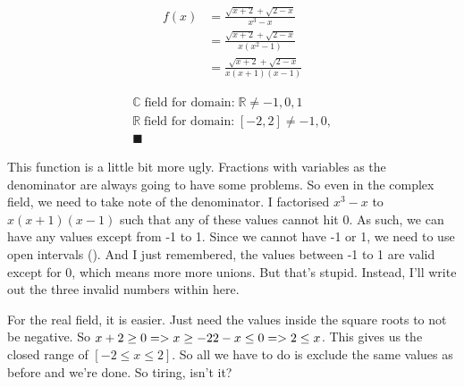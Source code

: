 \documentclass[17 pt]{extarticle}
\begin{document}
\vspace{5mm}

\begin{equation*}
    \begin{split}
        f(x) &= \frac{\sqrt{x+2} + \sqrt{2-x}}{x^3-x} \\
        &= \frac{\sqrt{x+2} + \sqrt{2-x}}{x(x^2 - 1)} \\
        &= \frac{\sqrt{x+2} + \sqrt{2-x}}{x(x+1)(x-1)}
    \end{split}
    \end{equation*}

\vspace{5mm}

\begin{equation*}
    \begin{split}
        \mathbb{C} \; \text{field for domain:} \; \mathbb{R} \neq -1,0,1 \\
        \mathbb{R} \; \text{field for domain:} \; [-2,2] \neq -1, 0, \\ \blacksquare 
    \end{split}
    \end{equation*}

This function is a little bit more ugly. Fractions with variables as the denominator are always going to have some problems. So even in the complex field, 
we need to take note of the denominator. I factorised $ x^3-x $ to $ x(x+1)(x-1)$ such that any of these values cannot hit 0. As such, we can have any values except from -1 to 1.
Since we cannot have -1 or 1, we need to use open intervals (). And I just remembered, the values between -1 to 1 are valid except for 0, which means more more unions. But that's stupid.
Instead, I'll write out the three invalid numbers within here. 

\vspace{5mm}

For the real field, it is easier. Just need the values inside the square roots to not be negative. So $ x+2 \geq 0 => x \geq -2 \newline 2-x \leq 0  => 2 \leq x $. This gives us 
the closed range of $ [-2 \leq x \leq 2]$. So all we have to do is exclude the same values as before and we're done. So tiring, isn't it?


\enddocument{}
\end{document}
